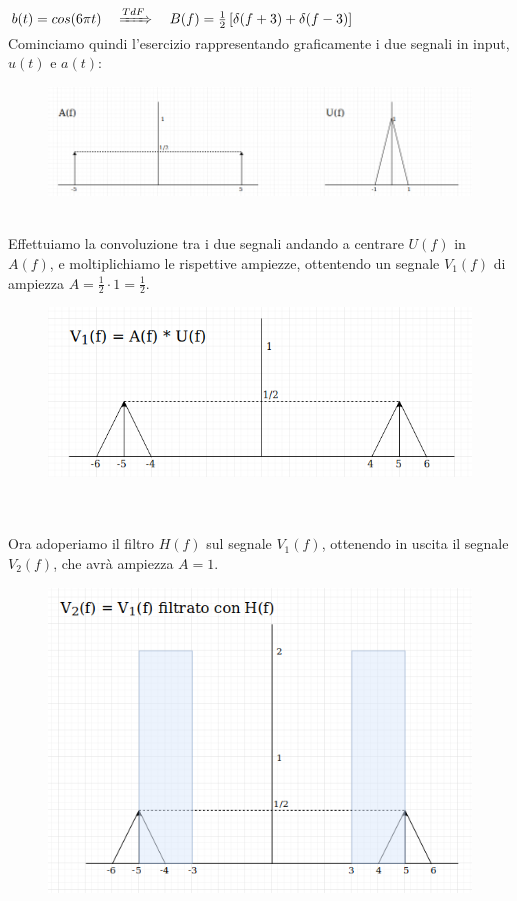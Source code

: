 \documentclass[12pt,a4paper]{article}
\begin{document}
	$b(t) = cos(6\pi t)\quad\xRightarrow[]{TdF}\quad B(f) = \frac{1}{2}\left[\delta(f+3) + \delta(f-3)\right]$\vspace{5px}\\Cominciamo quindi l'esercizio rappresentando graficamente i due segnali in input, $u(t)$ e $a(t)$:
	\begin{figure}[h!]
		\centering
		\includegraphics[scale=0.5]{./images/fourier32.png}
	\end{figure}
	\\Effettuiamo la convoluzione tra i due segnali andando a centrare $U(f)$ in $A(f)$, e moltiplichiamo le rispettive ampiezze, ottentendo un segnale $V_1(f)$ di ampiezza $A = \frac{1}{2} \cdot 1 = \frac{1}{2}$.
	\begin{figure}[h!]
		\centering
		\includegraphics[scale=0.5]{./images/fourier33.png}
	\end{figure}
	\\ \\Ora adoperiamo il filtro $H(f)$ sul segnale $V_1(f)$, ottenendo in uscita il segnale $V_2(f)$, che avrà ampiezza $A = 1$.
	\begin{figure}[h!]
		\centering
		\includegraphics[scale=0.4]{./images/fourier34.png}
	\end{figure}
\end{document}
